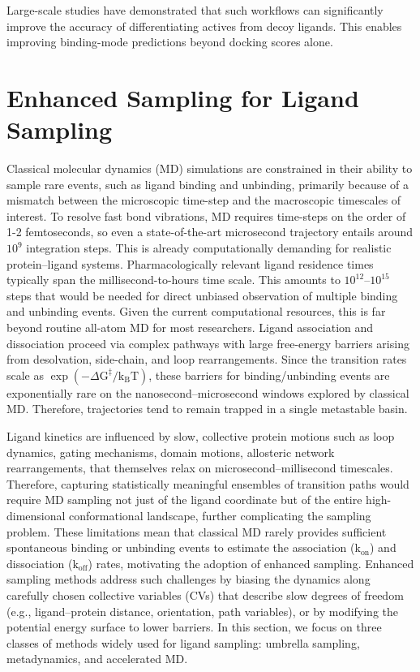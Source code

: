 \documentclass[12pt]{article}
\begin{document}
Large-scale studies have demonstrated that such workflows can significantly improve the accuracy of differentiating actives from decoy ligands. This enables improving binding-mode predictions beyond docking scores alone\cite{CH9_Cournia2017,CH9_guterres2020}.

\section{Enhanced Sampling for Ligand Sampling}

Classical molecular dynamics (MD) simulations are constrained in their ability to sample rare events, such as ligand binding and unbinding, primarily because of a mismatch between the microscopic time-step and the macroscopic timescales of interest. To resolve fast bond vibrations, MD requires time-steps on the order of 1-2 femtoseconds, so even a state-of-the-art microsecond trajectory entails around $10^9$ integration steps. This is already computationally demanding for realistic protein--ligand systems. Pharmacologically relevant ligand residence times typically span the millisecond-to-hours time scale. This amounts to $10^{12}$--$10^{15}$ steps that would be needed for direct unbiased observation of multiple binding and unbinding events\cite{CH9_miao2020ligand,CH9_ahmad2022enhanced}. Given the current computational resources, this is far beyond routine all-atom MD for most researchers. Ligand association and dissociation proceed via complex pathways with large free-energy barriers arising from desolvation, side-chain, and loop rearrangements. Since the transition rates scale as $\exp(-\Delta \textrm{G}^{\ddagger}/\textrm{k}_{\textrm{B}}\textrm{T})$, these barriers for binding/unbinding events are exponentially rare on the nanosecond--microsecond windows explored by classical MD. Therefore, trajectories tend to remain trapped in a single metastable basin. 

Ligand kinetics are influenced by slow, collective protein motions such as loop dynamics, gating mechanisms, domain motions, allosteric network rearrangements, that themselves relax on microsecond--millisecond timescales. Therefore, capturing statistically meaningful ensembles of transition paths would require MD sampling not just of the ligand coordinate but of the entire high-dimensional conformational landscape, further complicating the sampling problem. These limitations mean that classical MD rarely provides sufficient spontaneous binding or unbinding events to estimate the association ($\textrm{k}_{\textrm{on}}$) and dissociation ($\textrm{k}_{\textrm{off}}$) rates,  motivating the adoption of enhanced sampling. Enhanced sampling methods address such challenges by biasing the dynamics along carefully chosen collective variables (CVs) that describe slow degrees of freedom (e.g., ligand--protein distance, orientation, path variables), or by modifying the potential energy surface to lower barriers\cite{CH9_LaioParrinello2002,CH9_Barducci2008,CH9_Hamelberg2004}. In this section, we focus on three classes of methods widely used for ligand sampling: umbrella sampling, metadynamics, and accelerated MD.
\end{document}
